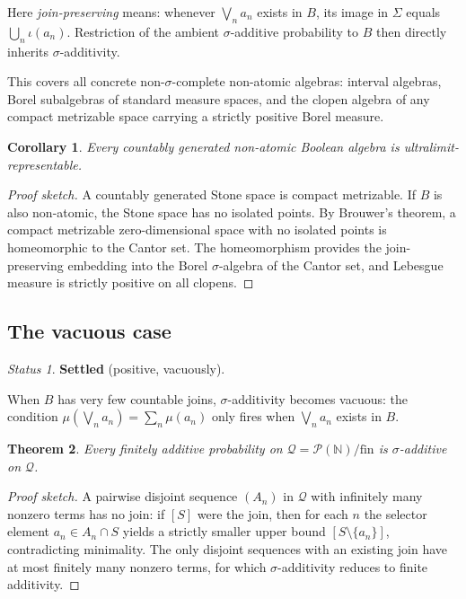 \documentclass[11pt]{article}
\newtheorem{theorem}{Theorem}
\newtheorem{corollary}[theorem]{Corollary}
\theoremstyle{definition}
\theoremstyle{remark}
\newtheorem*{status}{Status}
\newcommand{\N}{\mathbb{N}}
\begin{document}
Here \emph{join-preserving} means: whenever $\bigvee_n a_n$ exists in $B$, its
image in $\Sigma$ equals $\bigcup_n \iota(a_n)$. Restriction of the ambient
$\sigma$-additive probability to $B$ then directly inherits $\sigma$-additivity.

This covers all concrete non-$\sigma$-complete non-atomic algebras: interval
algebras, Borel subalgebras of standard measure spaces, and the clopen algebra
of any compact metrizable space carrying a strictly positive Borel measure.

\begin{corollary}
Every countably generated non-atomic Boolean algebra is ultralimit-representable.
\end{corollary}

\begin{proof}[Proof sketch]
A countably generated Stone space is compact metrizable. If $B$ is also non-atomic,
the Stone space has no isolated points. By Brouwer's theorem, a compact metrizable
zero-dimensional space with no isolated points is homeomorphic to the Cantor set.
The homeomorphism provides the join-preserving embedding into the Borel
$\sigma$-algebra of the Cantor set, and Lebesgue measure is strictly positive on
all clopens.
\end{proof}

\subsection{The vacuous case}

\begin{status}
\textbf{Settled} (positive, vacuously).
\end{status}

When $B$ has very few countable joins, $\sigma$-additivity becomes vacuous: the
condition $\mu(\bigvee_n a_n) = \sum_n\mu(a_n)$ only fires when $\bigvee_n a_n$
exists in $B$.

\begin{theorem}
Every finitely additive probability on $\mathcal{Q} = \mathcal{P}(\N)/\mathrm{fin}$
is $\sigma$-additive on $\mathcal{Q}$.
\end{theorem}

\begin{proof}[Proof sketch]
A pairwise disjoint sequence $(A_n)$ in $\mathcal{Q}$ with infinitely many nonzero
terms has no join: if $[S]$ were the join, then for each $n$ the selector element
$a_n \in A_n \cap S$ yields a strictly smaller upper bound $[S\setminus\{a_n\}]$,
contradicting minimality. The only disjoint sequences with an existing join have at
most finitely many nonzero terms, for which $\sigma$-additivity reduces to finite
additivity.
\end{proof}
\end{document}
